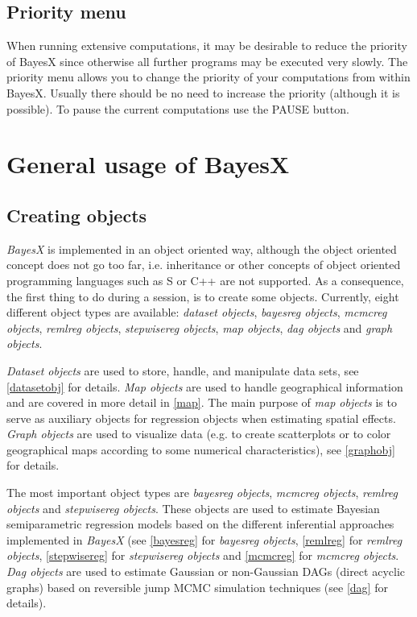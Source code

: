 \subsection{Priority menu}
\label{prioritymenu} 

When running extensive computations, it may be desirable to reduce the priority of BayesX since otherwise all further programs
may be executed very slowly. The priority menu allows you to change the priority of your computations from within BayesX.
Usually there should be no need to increase the priority (although it is possible). To pause the current computations use the
PAUSE button.

\section{General usage of BayesX}
\label{generalusage}

\subsection{Creating objects}
\label{createobject}  

{\em BayesX} is implemented in an object oriented way, although the object oriented concept does not go too far, i.e.
inheritance or other concepts of object oriented programming languages such as S or C++ are not supported. As a consequence,
the first thing to do during a session, is to create some objects. Currently, eight different object types are available: {\em
dataset objects}, {\em bayesreg objects}, {\em mcmcreg objects}, {\em remlreg objects}, {\em stepwisereg objects}, {\em map objects}, {\em dag objects} and {\em graph objects}.

{\em Dataset objects} are used to store, handle, and manipulate data sets, see \autoref{datasetobj} for details. {\em Map
objects} are used to handle geographical information and are covered in more detail in \autoref{map}. The main purpose of {\em
map objects} is to serve as auxiliary objects for regression objects when estimating spatial
effects. {\em Graph objects} are used to visualize data (e.g. to create scatterplots or to color geographical maps according to
some numerical characteristics), see \autoref{graphobj} for details.

The most important object types are {\em bayesreg objects}, {\em mcmcreg objects}, {\em remlreg objects} and {\em stepwisereg objects}. These objects are used to estimate Bayesian semiparametric regression models based on the different inferential approaches implemented in {\em BayesX} (see \autoref{bayesreg} for {\em bayesreg objects}, \autoref{remlreg} for {\em remlreg objects}, \autoref{stepwisereg} for {\em stepwisereg objects} and \autoref{mcmcreg} for {\em mcmcreg objects}. {\em Dag objects} are used to estimate Gaussian or non-Gaussian DAGs (direct
acyclic graphs) based on reversible jump MCMC simulation techniques (see \autoref{dag} for details).

